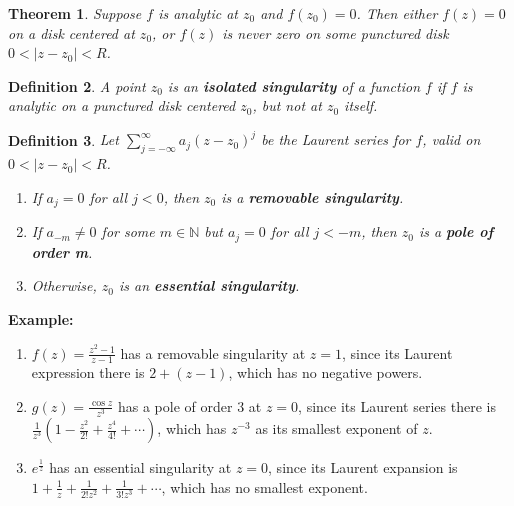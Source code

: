 \documentclass{article}
\theoremstyle{colontheorem}
\newtheorem{theorem}{Theorem}[section]
\newtheorem{definition}[theorem]{Definition}
\newenvironment{Theorem}
{
	\begin{mdframed}[backgroundcolor=TheoremOrange!10]
	\begin{theorem}
}
{
	\end{theorem}
	\end{mdframed}
	
	\vspace{.15in}
}
\newenvironment{Def}
{
	\begin{mdframed}[backgroundcolor=DefGreen!10]
	\begin{definition}
}
{
	\end{definition}
	\end{mdframed}
	
	\vspace{.15in}
}
\newenvironment{Example}
{
	\begin{mdframed}
	\textbf{Example:}%
}
{
	\end{mdframed}
	
	\vspace{.15in}
}
\begin{document}
\begin{Theorem}
	
	Suppose $f$ is analytic at $z_0$ and $f(z_0) = 0$. Then either $f(z) = 0$ on a disk centered at $z_0$, or $f(z)$ is never zero on some punctured disk $0 < |z - z_0| < R$.
	
\end{Theorem}



\begin{Def}
	
	A point $z_0$ is an \textbf{isolated singularity} of a function $f$ if $f$ is analytic on a punctured disk centered $z_0$, but not at $z_0$ itself.
	
\end{Def}



\begin{Def}
	
	Let $\displaystyle\sum\limits_{j=-\infty}^\infty a_j (z - z_0)^j$ be the Laurent series for $f$, valid on $0 < |z - z_0| < R$.
	
	\begin{enumerate}
		
		\item If $a_j = 0$ for all $j < 0$, then $z_0$ is a \textbf{removable singularity}.
		
		\item If $a_{-m} \neq 0$ for some $m \in \mathbb{N}$ but $a_j = 0$ for all $j < -m$, then $z_0$ is a \textbf{pole of order \emph{m}}.
		
		\item Otherwise, $z_0$ is an \textbf{essential singularity}.
		
	\end{enumerate}
	
\end{Def}



\begin{Example}
	\begin{enumerate}
		
		\item $f(z) = \frac{z^2 - 1}{z - 1}$ has a removable singularity at $z = 1$, since its Laurent expression there is $2 + (z-1)$, which has no negative powers.
		
		\item $g(z) = \frac{\cos z}{z^3}$ has a pole of order $3$ at $z = 0$, since its Laurent series there is $\frac{1}{z^3} \left( 1 - \frac{z^2}{2!} + \frac{z^4}{4!} + \cdots \right)$, which has $z^{-3}$ as its smallest exponent of $z$.
		
		\item $e^{\frac{1}{z}}$ has an essential singularity at $z = 0$, since its Laurent expansion is $1 + \frac{1}{z} + \frac{1}{2! z^2} + \frac{1}{3! z^3} + \cdots$, which has no smallest exponent.
		
	\end{enumerate}
	
\end{Example}
\end{document}

